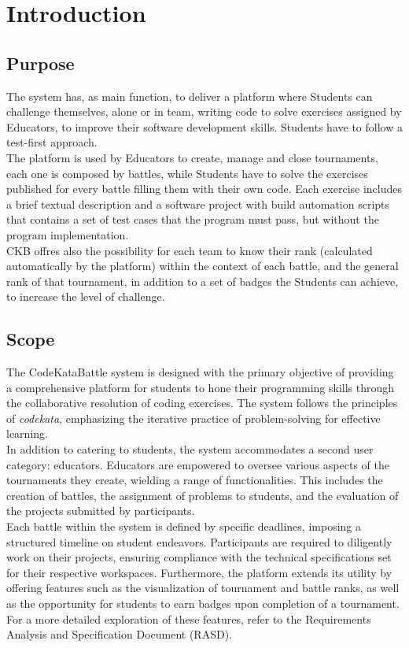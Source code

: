 \section{Introduction}

\subsection{Purpose}

The system has, as main function, to deliver a platform where Students can challenge themselves, alone or in team, writing code to solve exercises assigned by Educators, to improve their software development skills. Students have to follow a test-first approach.
\\The platform is used by Educators to create, manage and close tournaments, each one is composed by battles, while Students have to solve the exercises published for every battle filling them with their own code. Each exercise includes a brief textual description and a software project with build automation scripts that contains a set of test cases that the program must pass, but without the program implementation.
\\CKB offres also the possibility for each team to know their rank (calculated automatically by the platform) within the context of each battle, and the general rank of that tournament, in addition to a set of badges the Students can achieve, to increase the level of challenge. 

\vspace{24pt}

\subsection{Scope}

The CodeKataBattle system is designed with the primary objective of providing a comprehensive platform for students to hone their programming skills through the collaborative resolution of coding exercises. The system follows the principles of \textit{codekata}, emphasizing the iterative practice of problem-solving for effective learning. \\In addition to catering to students, the system accommodates a second user category: educators. Educators are empowered to oversee various aspects of the tournaments they create, wielding a range of functionalities. This includes the creation of battles, the assignment of problems to students, and the evaluation of the projects submitted by participants. \\Each battle within the system is defined by specific deadlines, imposing a structured timeline on student endeavors. Participants are required to diligently work on their projects, ensuring compliance with the technical specifications set for their respective workspaces. Furthermore, the platform extends its utility by offering features such as the visualization of tournament and battle ranks, as well as the opportunity for students to earn badges upon completion of a tournament. \\For a more detailed exploration of these features, refer to the Requirements Analysis and Specification Document (RASD).

